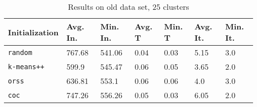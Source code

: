 \begin{table}[h]
	\begin{center}
		\begin{tabular}{|l|l|l|l|l|l|l|}
			\hline
			Initialization & Avg. In. & Min. In. & Avg. T & Min. T & Avg. It. & Min. It.\\\hline
			\texttt{random} & 767.68 & 541.06 & 0.04 & 0.03 & 5.15 & 3.0\\\hline
			\texttt{k-means++} & 599.9 & 545.47 & 0.06 & 0.05 & 3.65 & 2.0\\\hline
			\texttt{orss} & 636.81 & 553.1 & 0.06 & 0.06 & 4.0 & 3.0\\\hline
			\texttt{coc} & 747.26 & 556.26 & 0.05 & 0.03 & 6.05 & 2.0\\\hline
		\end{tabular}
		\caption{Results on old data set, 25 clusters}
		\label{tbl:old25}
	\end{center}
\end{table}

